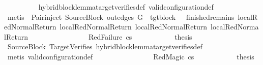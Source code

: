 \begin{isabellebody}
\ \ \ \ \ \ \ \ \isamarkupfalse%
\ hybrid{\isacharunderscore}{\kern0pt}block{\isacharunderscore}{\kern0pt}lemma{\isacharunderscore}{\kern0pt}target{\isacharunderscore}{\kern0pt}verifies{\isacharunderscore}{\kern0pt}def\ valid{\isacharunderscore}{\kern0pt}configuration{\isacharunderscore}{\kern0pt}def\isanewline
\ \ \ \ \ \ \ \ \isamarkupfalse%
\ {\isacharparenleft}{\kern0pt}metis\ {\isachardoublequoteopen}{}{\isachardoublequoteclose}{\isacharparenleft}{\kern0pt}{}{\isacharparenright}{\kern0pt}\ Pair{\isacharunderscore}{\kern0pt}inject\ SourceBlock\ {\isacartoucheopen}out{\isacharunderscore}{\kern0pt}edges\ G{\isacharprime}{\kern0pt}\ {\isacharbang}{\kern0pt}\ tgt{\isacharunderscore}{\kern0pt}block\ {\isacharequal}{\kern0pt}\ {\isacharbrackleft}{\kern0pt}{\isacharbrackright}{\kern0pt}{\isacartoucheclose}\ finished{\isacharunderscore}{\kern0pt}remains\ local{\isachardot}{\kern0pt}RedNormalReturn{\isacharparenleft}{\kern0pt}{}{\isacharparenright}{\kern0pt}\ local{\isachardot}{\kern0pt}RedNormalReturn{\isacharparenleft}{\kern0pt}{}{\isacharparenright}{\kern0pt}\ local{\isachardot}{\kern0pt}RedNormalReturn{\isacharparenleft}{\kern0pt}{}{\isacharparenright}{\kern0pt}\ local{\isachardot}{\kern0pt}RedNormalReturn{\isacharparenleft}{\kern0pt}{}{\isacharparenright}{\kern0pt}{\isacharparenright}{\kern0pt}\isanewline
\ \ \ \ \ \ \isamarkupfalse%
\isanewline
\ \ \ \ \ \ \ \ \isamarkupfalse%
\ {\isacharparenleft}{\kern0pt}RedFailure\ cs{\isacharparenright}{\kern0pt}\isanewline
\ \ \ \ \ \ \ \ \isamarkupfalse%
\ \isamarkupfalse%
\ {\isacharquery}{\kern0pt}thesis\ \isanewline
\ \ \ \ \ \ \ \ \ \ \isamarkupfalse%
\ SourceBlock\ TargetVerifies\ hybrid{\isacharunderscore}{\kern0pt}block{\isacharunderscore}{\kern0pt}lemma{\isacharunderscore}{\kern0pt}target{\isacharunderscore}{\kern0pt}verifies{\isacharunderscore}{\kern0pt}def\isanewline
\ \ \ \ \ \ \ \ \ \ \isamarkupfalse%
\ {\isacharparenleft}{\kern0pt}metis\ valid{\isacharunderscore}{\kern0pt}configuration{\isacharunderscore}{\kern0pt}def{\isacharparenright}{\kern0pt}\isanewline
\ \ \ \ \ \ \isamarkupfalse%
\isanewline
\ \ \ \ \ \ \ \ \isamarkupfalse%
\ {\isacharparenleft}{\kern0pt}RedMagic\ cs{\isacharparenright}{\kern0pt}\isanewline
\ \ \ \ \ \ \ \ \isamarkupfalse%
\ \isamarkupfalse%
\ {\isacharquery}{\kern0pt}thesis\ \isanewline

\end{isabellebody}
